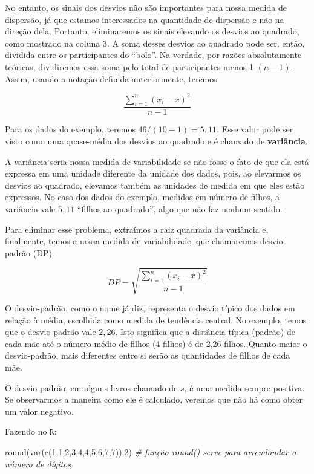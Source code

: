 \documentclass[
]{book}
\newenvironment{Shaded}{\begin{snugshade}}{\end{snugshade}}
\newcommand{\CommentTok}[1]{\textcolor[rgb]{0.56,0.35,0.01}{\textit{#1}}}
\newcommand{\DecValTok}[1]{\textcolor[rgb]{0.00,0.00,0.81}{#1}}
\newcommand{\FunctionTok}[1]{\textcolor[rgb]{0.00,0.00,0.00}{#1}}
\newcommand{\NormalTok}[1]{#1}
\begin{document}
No entanto, os sinais dos desvios não são importantes para nossa medida de dispersão, já que estamos interessados na quantidade de dispersão e não na direção dela. Portanto, eliminaremos os sinais elevando os desvios ao quadrado, como mostrado na coluna 3. A soma desses desvios ao quadrado pode ser, então, dividida entre os participantes do ``bolo''. Na verdade, por razões absolutamente teóricas, dividiremos essa soma pelo total de participantes menos 1 \((n-1)\). Assim, usando a notação definida anteriormente, teremos

\begin{equation*}
\frac{\sum_{i=1}^n (x_i-\bar x)^2}{n-1}
\end{equation*}

Para os dados do exemplo, teremos \(46/(10-1)=5,11\). Esse valor pode ser visto como uma quase-média dos desvios ao quadrado e é chamado de \textbf{variância}.

A variância seria nossa medida de variabilidade se não fosse o fato de que ela está expressa em uma unidade diferente da unidade dos dados, pois, ao elevarmos os desvios ao quadrado, elevamos também as unidades de medida em que eles estão expressos. No caso dos dados do exemplo, medidos em número de filhos, a variância vale \(5,11\) ``filhos ao quadrado'', algo que não faz nenhum sentido.

Para eliminar esse problema, extraímos a raiz quadrada da variância e, finalmente, temos a nossa medida de variabilidade, que chamaremos desvio-padrão (DP).

\begin{equation*}
DP=\sqrt{\frac{\sum_{i=1}^n (x_i-\bar x)^2}{n-1}}
\end{equation*}

O desvio-padrão, como o nome já diz, representa o desvio típico dos dados em relação à média, escolhida como medida de tendência central. No exemplo, temos que o desvio padrão vale \(2,26\). Isto significa que a distância típica (padrão) de cada mãe até o número médio de filhos (4 filhos) é de 2,26 filhos. Quanto maior o desvio-padrão, mais diferentes entre si serão as quantidades de filhos de cada mãe.

O desvio-padrão, em alguns livros chamado de \(s\), é uma medida sempre positiva. Se observarmos a maneira como ele é calculado, veremos que não há como obter um valor
negativo.

Fazendo no \(\texttt{R}\):

\begin{Shaded}
\begin{Highlighting}[]
\FunctionTok{round}\NormalTok{(}\FunctionTok{var}\NormalTok{(}\FunctionTok{c}\NormalTok{(}\DecValTok{1}\NormalTok{,}\DecValTok{1}\NormalTok{,}\DecValTok{2}\NormalTok{,}\DecValTok{3}\NormalTok{,}\DecValTok{4}\NormalTok{,}\DecValTok{4}\NormalTok{,}\DecValTok{5}\NormalTok{,}\DecValTok{6}\NormalTok{,}\DecValTok{7}\NormalTok{,}\DecValTok{7}\NormalTok{)),}\DecValTok{2}\NormalTok{) }\CommentTok{\# função round() serve para arrendondar o número de dígitos}
\end{Highlighting}
\end{Shaded}
\end{document}

